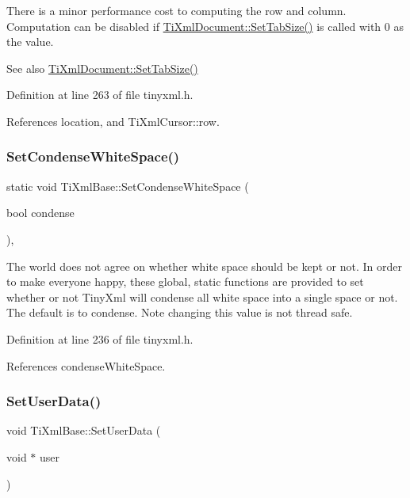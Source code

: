 There is a minor performance cost to computing the row and column. Computation can be disabled if \hyperlink{class_ti_xml_document_a51dac56316f89b35bdb7d0d433ba988e}{Ti\+Xml\+Document\+::\+Set\+Tab\+Size()} is called with 0 as the value.

\begin{DoxySeeAlso}{See also}
\hyperlink{class_ti_xml_document_a51dac56316f89b35bdb7d0d433ba988e}{Ti\+Xml\+Document\+::\+Set\+Tab\+Size()} 
\end{DoxySeeAlso}


Definition at line 263 of file tinyxml.\+h.



References location, and Ti\+Xml\+Cursor\+::row.

\hypertarget{class_ti_xml_base_a0f799ec645bfb8d8a969e83478f379c1}{}\label{class_ti_xml_base_a0f799ec645bfb8d8a969e83478f379c1} 
\subsubsection{\texorpdfstring{Set\+Condense\+White\+Space()}{SetCondenseWhiteSpace()}}
{\footnotesize\ttfamily static void Ti\+Xml\+Base\+::\+Set\+Condense\+White\+Space (\begin{DoxyParamCaption}\item[{bool}]{condense }\end{DoxyParamCaption})\hspace{0.3cm}{\ttfamily [inline]}, {\ttfamily [static]}}

The world does not agree on whether white space should be kept or not. In order to make everyone happy, these global, static functions are provided to set whether or not Tiny\+Xml will condense all white space into a single space or not. The default is to condense. Note changing this value is not thread safe. 

Definition at line 236 of file tinyxml.\+h.



References condense\+White\+Space.

\hypertarget{class_ti_xml_base_ac6b3e0f790930d4970ec30764e937b5d}{}\label{class_ti_xml_base_ac6b3e0f790930d4970ec30764e937b5d} 
\subsubsection{\texorpdfstring{Set\+User\+Data()}{SetUserData()}}
{\footnotesize\ttfamily void Ti\+Xml\+Base\+::\+Set\+User\+Data (\begin{DoxyParamCaption}\item[{void $\ast$}]{user }\end{DoxyParamCaption})\hspace{0.3cm}{\ttfamily [inline]}}



